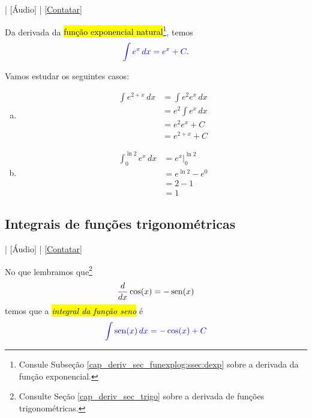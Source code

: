 \begin{flushright}
  [Vídeo] | [Áudio] | \href{https://phkonzen.github.io/notas/contato.html}{[Contatar]}
\end{flushright}

Da derivada da \hl{função exponencial natural}\footnote{Consule Subseção \ref{cap_deriv_sec_funexplog:ssec:dexp} sobre a derivada da função exponencial.}, temos
\begin{equation}\color{blue}\int e^x\,dx = e^x + C.
\end{equation}

\begin{ex}
  Vamos estudar os seguintes casos:
  \begin{enumerate}[a)]
  \item
    \begin{align}
      \int e^{2 + x}\,dx &= \int e^2e^x\,dx \\
                         &= e^2\int e^x\,dx \\
                         &= e^2e^x + C \\
                         &= e^{2+x} + C
    \end{align}
  \item
    \begin{align}
      \int_{0}^{\ln 2}e^x\,dx &= \left. e^x\right|_0^{\ln 2}\\
                              &= e^{\ln 2} - e^0\\
                              &= 2 - 1\\
                              &= 1
    \end{align}
\end{enumerate}
\end{ex}

\subsection{Integrais de funções trigonométricas}\label{cap_int_sec_regrasbasic_trigo}

\begin{flushright}
  [Vídeo] | [Áudio] | \href{https://phkonzen.github.io/notas/contato.html}{[Contatar]}
\end{flushright}

No que lembramos que\footnote{Consulte Seção \ref{cap_deriv_sec_trigo} sobre a derivada de funções trigonométricas.}
\begin{equation}
  \frac{d}{dx}\cos(x) = -\operatorname{sen}(x)
\end{equation}
temos que a \hl{\emph{integral da função seno}} é
\begin{equation}\color{blue}\int \operatorname{sen}(x)\,dx = -\cos(x) + C
\end{equation}

